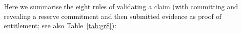 Here we summarise the eight rules of validating a claim (with committing and revealing a reserve commitment and then submitted evidence as proof of entitlement; see also Table~\ref{tab:gr8}):%
%
%
